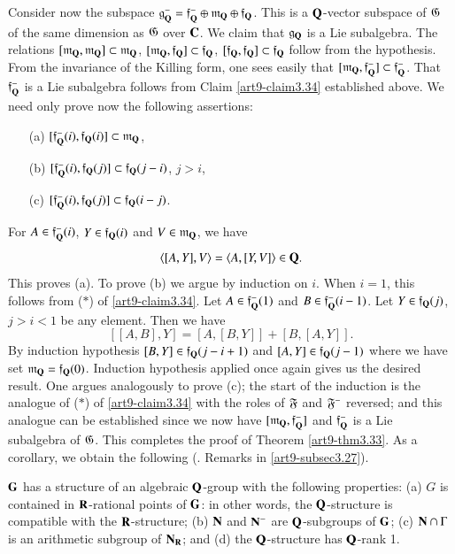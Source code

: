 \subsection{}\label{art9-subsec3.36}
Consider now the subspace $\mathfrak{g}^-_{\mathbf{Q}} = \mathfrak{f}^-_{\mathbf{Q}} \oplus \mathfrak{m}_{\mathbf{Q}}\oplus \mathfrak{f}_{\mathbf{Q}}$. This is a $\mathbf{Q}$-vector subspace of $\mathfrak{G}$ of the same dimension as $\mathfrak{G}$ over $\mathbf{C}$. We claim that $\mathfrak{g}_{\mathbf{Q}}$ is a Lie subalgebra. The relations $[\mathfrak{m}_{\mathbf{Q}}, \mathfrak{m}_{\mathbf{Q}}] \subset \mathfrak{m}_{\mathbf{Q}}$, $[\mathfrak{m}_{\mathbf{Q}}, \mathfrak{f}_{\mathbf{Q}}] \subset \mathfrak{f}_{\mathbf{Q}}$, $[\mathfrak{f}_{\mathbf{Q}}, \mathfrak{f}_{\mathbf{Q}}] \subset \mathfrak{f}_{\mathbf{Q}}$ follow from the hypothesis. From the invariance of the Killing form, one sees easily that $[\mathfrak{m}_{\mathbf{Q}}, \mathfrak{f}^-_{\mathbf{Q}}] \subset \mathfrak{f}^-_{\mathbf{Q}}$. That $\mathfrak{f}^-_{\mathbf{Q}}$ is a Lie subalgebra follows from Claim \ref{art9-claim3.34} established above. We need only prove now the following assertions: 
\begin{itemize}
\item[(a)] $[\mathfrak{f}^-_{\mathbf{Q}} (i), \mathfrak{f}_{\mathbf{Q}} (i)] \subset \mathfrak{m}_{\mathbf{Q}}$, 

\item[(b)] $[\mathfrak{f}^-_{\mathbf{Q}} (i), \mathfrak{f}_{\mathbf{Q}} (j)] \subset \mathfrak{f}_{\mathbf{Q}} (j-i)$,  $j > i$,

\item[(c)] $[\mathfrak{f}^-_{\mathbf{Q}} (i), \mathfrak{f}_{\mathbf{Q}} (j)] \subset \mathfrak{f}_{\mathbf{Q}} (i - j)$. 
\end{itemize}
For $A \in\mathfrak{f}^-_{\mathbf{Q}} (i)$, $Y \in \mathfrak{f}_{\mathbf{Q}} (i)$ and $V \in \mathfrak{m}_{\mathbf{Q}}$, we have 
$$
\langle[A, Y], V \rangle  = \langle A, [Y, V]  \rangle \in \mathbf{Q}.
$$\pageoriginale 
This proves (a). To prove (b) we argue by induction on $i$. When $i=1$, this follows from ($\ast$) of \ref{art9-claim3.34}. Let $A \in \mathfrak{f}^-_{\mathbf{Q}}(1)$ and $B \in \mathfrak{f}^-_{\mathbf{Q}} (i -1)$. Let $Y \in \mathfrak{f}_{\mathbf{Q}} (j)$, $j > i < 1$ be any element. Then we have
$$
[[A, B], Y] = [A, [B, Y]] + [B, [A, Y]].
$$
By induction hypothesis $[B,Y] \in \mathfrak{f}_{\mathbf{Q}} (j-i+1)$ and $[A, Y] \in \mathfrak{f}_{\mathbf{Q}} (j-1)$ where we have set $\mathfrak{m}_{\mathbf{Q}} = \mathfrak{f}_{\mathbf{Q}}(0)$. Induction hypothesis applied once again gives us the desired result. One argues analogously to prove (c); the start of the induction is the analogue of ($\ast$) of \ref{art9-claim3.34} with the roles of $\mathfrak{F}$ and $\mathfrak{F}^-$ reversed; and this analogue can be established since we now have $[\mathfrak{m}_{\mathbf{Q}}, \mathfrak{f}^-_{\mathbf{Q}}]$ and $\mathfrak{f}^-_{\mathbf{Q}}$ is a Lie subalgebra of $\mathfrak{G}$. This completes the proof of Theorem \ref{art9-thm3.33}. As a corollary, we obtain the following (\cf. Remarks in \ref{art9-subsec3.27}).

\setcounter{definition}{36}
\begin{theorem}\label{art9-thm3.37}
$\mathbf{G}$ has a structure of an algebraic $\mathbf{Q}$-group with the following properties: (a) $G$ is contained in $\mathbf{R}$-rational points of $\mathbf{G}$: in other words, the $\mathbf{Q}$-structure is compatible with the $\mathbf{R}$-structure; (b) $\mathbf{N}$ and $\mathbf{N}^-$ are $\mathbf{Q}$-subgroups of $\mathbf{G}$; (c) $\mathbf{N} \cap \Gamma$ is an arithmetic subgroup of $\mathbf{N}_{\mathbf{R}}$; and (d) the $\mathbf{Q}$-structure has $\mathbf{Q}$-rank 1.
\end{theorem}

